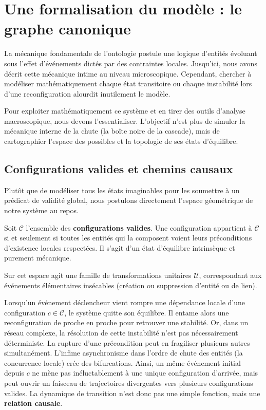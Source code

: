 \documentclass{report}
\begin{document}
\section{Une formalisation du modèle : le graphe canonique}

La mécanique fondamentale de l'ontologie postule une logique d'entités évoluant sous l'effet d'événements dictés par des contraintes locales. Jusqu'ici, nous avons décrit cette mécanique intime au niveau microscopique. Cependant, chercher à modéliser mathématiquement chaque état transitoire ou chaque instabilité lors d'une reconfiguration alourdit inutilement le modèle. 

Pour exploiter mathématiquement ce système et en tirer des outils d'analyse macroscopique, nous devons l'essentialiser. L'objectif n'est plus de simuler la mécanique interne de la chute (la \og{}boîte noire\fg{} de la cascade), mais de cartographier l'espace des possibles et la topologie de ses états d'équilibre.

\subsection{Configurations valides et chemins causaux}

Plutôt que de modéliser tous les états imaginables pour les soumettre à un prédicat de validité global, nous postulons directement l'espace géométrique de notre système au repos. 

Soit $\mathcal{C}$ l'ensemble des \textbf{configurations valides}. Une configuration appartient à $\mathcal{C}$ si et seulement si toutes les entités qui la composent voient leurs préconditions d'existence locales respectées. Il s'agit d'un état d'équilibre intrinsèque et purement mécanique.

Sur cet espace agit une famille de transformations unitaires $\mathcal{U}$, correspondant aux événements élémentaires insécables (création ou suppression d'entité ou de lien). 

Lorsqu'un événement déclencheur vient rompre une dépendance locale d'une configuration $c \in \mathcal{C}$, le système quitte son équilibre. Il entame alors une reconfiguration de proche en proche pour retrouver une stabilité. Or, dans un réseau complexe, la résolution de cette instabilité n'est pas nécessairement déterministe. La rupture d'une précondition peut en fragiliser plusieurs autres simultanément. L'infime asynchronisme dans l'ordre de chute des entités (la concurrence locale) crée des bifurcations. Ainsi, un même événement initial depuis $c$ ne mène pas inéluctablement à une unique configuration d'arrivée, mais peut ouvrir un faisceau de trajectoires divergentes vers plusieurs configurations valides. La dynamique de transition n'est donc pas une simple fonction, mais une \textbf{relation causale}.
\end{document}
